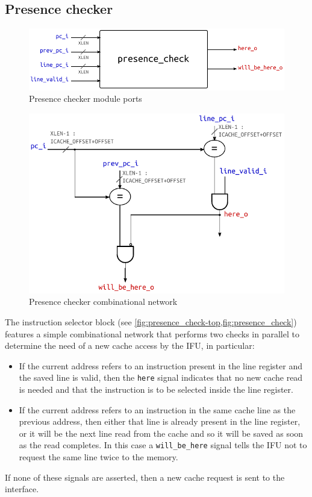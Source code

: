 \subsection{Presence checker}
\begin{figure}[hbt]
  \centering
  \includegraphics{img/presence_check-top.pdf}
  \caption{Presence checker module ports}
  \label{fig:presence_check-top}
\end{figure}
\begin{figure}[hbt]
  \centering
  \includegraphics{img/presence_check.pdf}
  \caption{Presence checker combinational network}
  \label{fig:presence_check}
\end{figure}
The instruction selector block (see \cref{fig:presence_check-top,fig:presence_check}) features a simple combinational network that performs two checks in parallel to determine the need of a new cache access by the \ac{IFU}, in particular:
\begin{itemize}
  \item If the current address refers to an instruction present in the line register and the saved line is valid, then the \texttt{here} signal indicates that no new cache read is needed and that the instruction is to be selected inside the line register.
  \item If the current address refers to an instruction in the same cache line as the previous address, then either that line is already present in the line register, or it will be the next line read from the cache and so it will be saved as soon as the read completes. In this case a \texttt{will\_be\_here} signal tells the \ac{IFU} not to request the same line twice to the memory. 
\end{itemize}
If none of these signals are asserted, then a new cache request is sent to the interface.

